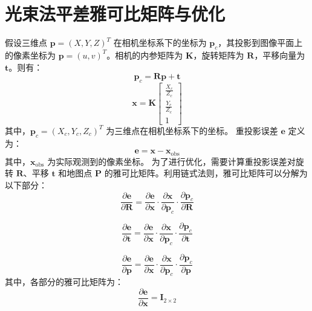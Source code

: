 \section{光束法平差雅可比矩阵与优化}
\label{appendix:bundle_adjustment}
假设三维点 \( \symbf{p} = (X, Y, Z)^T \) 在相机坐标系下的坐标为 \( \symbf{p}_c \)，其投影到图像平面上的像素坐标为 \( \symbf{p} = (u, v)^T \)。相机的内参矩阵为 \( \symbf{K} \)，旋转矩阵为 \( \symbf{R} \)，平移向量为 \( \symbf{t} \)。则有：
\begin{equation}
\symbf{p}_c = \symbf{R} \symbf{p} + \symbf{t}
\end{equation}
\begin{equation}
\symbf{x} = \symbf{K} \begin{bmatrix}
\frac{X_c}{Z_c} \\
\frac{Y_c}{Z_c} \\
1
\end{bmatrix}
\end{equation}
其中，\( \symbf{p}_c = (X_c, Y_c, Z_c)^T \) 为三维点在相机坐标系下的坐标。
重投影误差 \( \symbf{e} \) 定义为：
\begin{equation}
\symbf{e} = \symbf{x} - \symbf{x}_{\text{obs}}
\end{equation}
其中，\( \symbf{x}_{\text{obs}} \) 为实际观测到的像素坐标。
为了进行优化，需要计算重投影误差对旋转 \( \symbf{R} \)、平移 \( \symbf{t} \) 和地图点 \( \symbf{P} \) 的雅可比矩阵。利用链式法则，雅可比矩阵可以分解为以下部分：
\begin{equation}
\frac{\partial \symbf{e}}{\partial \symbf{R}} = \frac{\partial \symbf{e}}{\partial \symbf{x}} \cdot \frac{\partial \symbf{x}}{\partial \symbf{p}_c} \cdot \frac{\partial \symbf{p}_c}{\partial \symbf{R}}
\end{equation}

\begin{equation}
\frac{\partial \symbf{e}}{\partial \symbf{t}} = \frac{\partial \symbf{e}}{\partial \symbf{x}} \cdot \frac{\partial \symbf{x}}{\partial \symbf{p}_c} \cdot \frac{\partial \symbf{p}_c}{\partial \symbf{t}}
\end{equation}

\begin{equation}
\frac{\partial \symbf{e}}{\partial \symbf{p}} = \frac{\partial \symbf{e}}{\partial \symbf{x}} \cdot \frac{\partial \symbf{x}}{\partial \symbf{p}_c} \cdot \frac{\partial \symbf{p}_c}{\partial \symbf{p}}
\end{equation}
其中，各部分的雅可比矩阵为：
\begin{equation}
\frac{\partial \symbf{e}}{\partial \symbf{x}} = \symbf{I}_{2 \times 2}
\end{equation}

